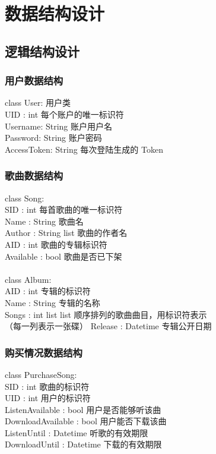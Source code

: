 \chapter{数据结构设计}
\section{逻辑结构设计}
\subsection{用户数据结构}

class User:             用户类\\
\indent \indent    UID : int           每个账户的唯一标识符\\
\indent \indent    Username: String    账户用户名\\
\indent \indent    Password: String    账户密码\\
\indent \indent    AccessToken: String 每次登陆生成的 Token

\subsection{歌曲数据结构}

class Song:\\
\indent \indent   SID : int           每首歌曲的唯一标识符\\
\indent \indent   Name : String       歌曲名\\
\indent \indent   Author : String list 歌曲的作者名\\
\indent \indent   AID : int           歌曲的专辑标识符\\
\indent \indent   Available : bool    歌曲是否已下架\\
\\
class Album:\\
\indent \indent    AID : int           专辑的标识符\\
\indent \indent    Name : String       专辑的名称\\
\indent \indent    Songs : int list list   顺序排列的歌曲曲目，用标识符表示\\
\indent \indent                            （每一列表示一张碟）
\indent \indent    Release : Datetime  专辑公开日期

\subsection{购买情况数据结构}

class PurchaseSong:\\
\indent \indent    SID : int           歌曲的标识符\\
\indent \indent    UID : int           用户的标识符\\
\indent \indent    ListenAvailable : bool    用户是否能够听该曲\\
\indent \indent    DownloadAvailable : bool  用户能否下载该曲\\
\indent \indent    ListenUntil : Datetime    听歌的有效期限\\
\indent \indent    DownloadUntil : Datetime  下载的有效期限

